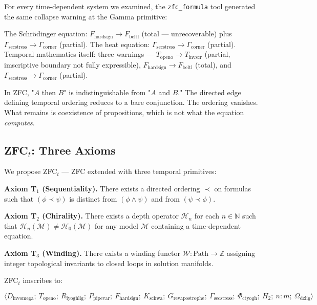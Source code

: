 \documentclass[12pt,a4paper]{article}
\begin{document}
For every time-dependent system we examined, the \texttt{zfc\_formula} tool generated the same collapse warning at the Gamma primitive:

\begin{quote}
\end{quote}

The Schrödinger equation: $F_{\text{hardsign}} \to F_{\text{beltl}}$ (total --- unrecoverable) plus $\Gamma_{\text{secstress}} \to \Gamma_{\text{corner}}$ (partial). The heat equation: $\Gamma_{\text{secstress}} \to \Gamma_{\text{corner}}$ (partial). Temporal mathematics itself: three warnings --- $T_{\text{openo}} \to T_{\text{invscr}}$ (partial, imscriptive boundary not fully expressible), $F_{\text{hardsign}} \to F_{\text{beltl}}$ (total), and $\Gamma_{\text{secstress}} \to \Gamma_{\text{corner}}$ (partial).

In ZFC, "$A$ then $B$" is indistinguishable from "$A$ and $B$." The directed edge defining temporal ordering reduces to a bare conjunction. The ordering vanishes. What remains is coexistence of propositions, which is not what the equation \emph{computes}.

\subsection{ZFC$_t$: Three Axioms}

We propose ZFC$_t$ --- ZFC extended with three temporal primitives:

\textbf{Axiom T$_1$ (Sequentiality).} There exists a directed ordering $\prec$ on formulas such that $(\phi \prec \psi)$ is distinct from $(\phi \wedge \psi)$ and from $(\psi \prec \phi)$.

\textbf{Axiom T$_2$ (Chirality).} There exists a depth operator $\mathcal{H}_n$ for each $n \in \mathbb{N}$ such that $\mathcal{H}_n(\mathcal{M}) \neq \mathcal{H}_0(\mathcal{M})$ for any model $\mathcal{M}$ containing a time-dependent equation.

\textbf{Axiom T$_3$ (Winding).} There exists a winding functor $\mathcal{W}: \text{Path} \to \mathbb{Z}$ assigning integer topological invariants to closed loops in solution manifolds.

ZFC$_t$ imscribes to:

\[\langle D_{\text{invomega}};\ T_{\text{openo}};\ R_{\text{lyoghlig}};\ P_{\text{pipevar}};\ F_{\text{hardsign}};\ K_{\text{schwa}};\ G_{\text{revapostrophe}};\ \Gamma_{\text{secstress}};\ \Phi_{\text{ctyogh}};\ H_2;\ n{:}m;\ \Omega_{\text{dzlig}} \rangle\]
\end{document}
